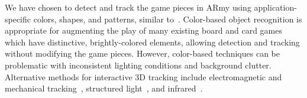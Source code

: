 \documentclass[10pt,twocolumn,letterpaper]{article}
\begin{document}
We have chosen to detect and track the game pieces in ARmy using
application-specific colors, shapes, and patterns, similar
to~\cite{Underkoffler1999}.
%
Color-based object recognition is appropriate for augmenting the play
of many existing board and card games which have distinctive,
brightly-colored elements, allowing detection and tracking without
modifying the game pieces.
However, color-based techniques can be problematic with inconsistent
lighting conditions and background clutter.
%
Alternative methods for interactive 3D tracking include
electromagnetic and mechanical tracking~\cite{Cruz-Neira1993},
structured light~\cite{Ashdown2004,Lee2004}, and
infrared~\cite{Lee2007,Kinect,Maimone12}.



\end{document}
